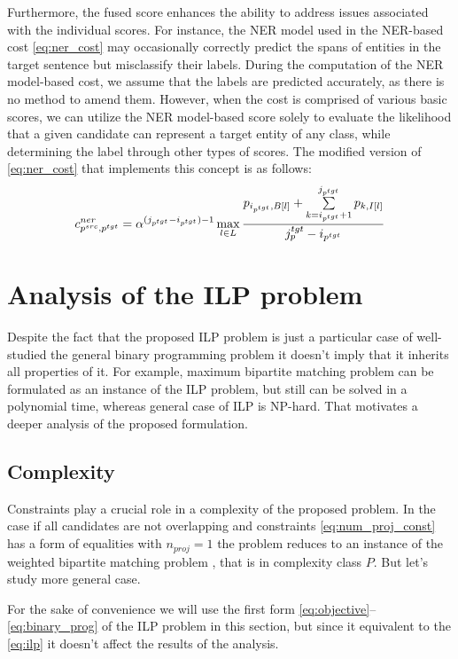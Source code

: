 Furthermore, the fused score enhances the ability to address issues associated with
the individual scores. For instance, the NER model used in the NER-based cost
\eqref{eq:ner_cost} may occasionally correctly predict the spans of entities in the
target sentence but misclassify their labels. During the computation of the NER
model-based cost, we assume that the labels are predicted accurately, as there is
no method to amend them. However, when the cost is comprised of various basic scores,
we can utilize the NER model-based score solely to evaluate the likelihood that a
given candidate can represent a target entity of any class, while determining the
label through other types of scores. The modified version of \eqref{eq:ner_cost} that
implements this concept is as follows:
\begin{equation} \label{eq:ner_cost_wo_classes}
  c_{p^{src}, p^{tgt}}^{ner} = \alpha^{(j_{p^{tgt}} - i_{p^{tgt}}) - 1}
  \max\limits_{l \in L}
  \frac{
    p_{i_{p^{tgt}}, B[l]} +
    \sum\limits_{k = i_{p^{tgt}} + 1}^{j_{p^{tgt}}} p_{k, I[l]}
  }
  {j_p^{tgt} - i_{p^{tgt}}}
\end{equation}

\section{Analysis of the ILP problem}
Despite the fact that the proposed ILP problem is just a particular case
of well-studied the general binary programming problem it doesn't imply that
it inherits all properties of it. For example, maximum bipartite matching problem
can be formulated as an instance of the ILP problem, but still can be solved in a
polynomial time, whereas general case of ILP is NP-hard. That motivates a deeper analysis
of the proposed formulation.

\subsection{Complexity}
Constraints play a crucial role in a complexity of the proposed problem. In the case if all candidates are not overlapping and constraints
\eqref{eq:num_proj_const} has a form of equalities with \( n_{proj} = 1 \) the problem reduces to
an instance of the weighted bipartite matching problem \cite{pemmaraju2003computational}, that is in complexity class \( P \).
But let's study more general case.

For the sake of convenience we will use the first form \eqref{eq:objective}--\eqref{eq:binary_prog}
of the ILP problem in this section, but since it equivalent to the \eqref{eq:ilp} it doesn't affect
the results of the analysis.

